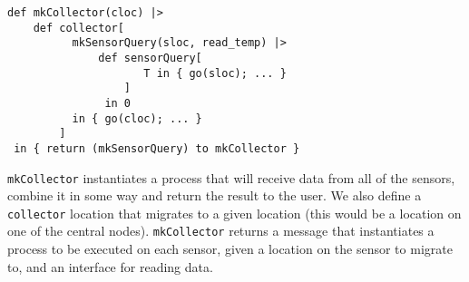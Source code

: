 \begin{verbatim}
def mkCollector(cloc) |>
    def collector[
          mkSensorQuery(sloc, read_temp) |>
              def sensorQuery[
                     T in { go(sloc); ... }
                  ]
               in 0
          in { go(cloc); ... }
        ]
 in { return (mkSensorQuery) to mkCollector }
\end{verbatim}

\verb!mkCollector! instantiates a process that will receive data
from all of the sensors, combine it in some way and return the
result to the user. We also define a \verb!collector! location that
migrates to a given location (this would be a location on one of
the central nodes). \verb!mkCollector! returns a message that
instantiates a process to be executed on each sensor, given a
location on the sensor to migrate to, and an interface for reading
data.
